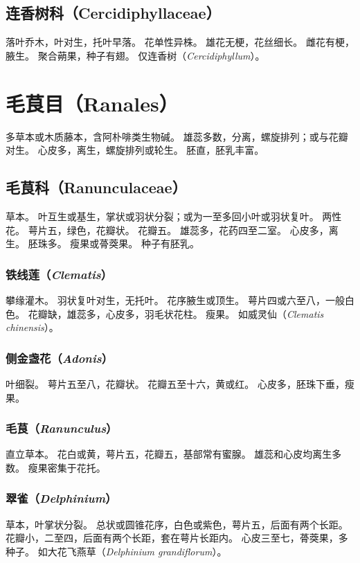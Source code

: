 \documentclass[11pt]{article}
\begin{document}
\begin{sloppypar}
\subsection{连香树科（Cercidiphyllaceae）}
落叶乔木，叶对生，托叶早落。
花单性异株。
雄花无梗，花丝细长。
雌花有梗，腋生。
聚合蒴果，种子有翅。
仅连香树（\textit{Cercidiphyllum}）。

\section{毛茛目（Ranales）}
多草本或木质藤本，含阿朴啡类生物碱。
雄蕊多数，分离，螺旋排列；或与花瓣对生。
心皮多，离生，螺旋排列或轮生。
胚直，胚乳丰富。

\subsection{毛茛科（Ranunculaceae）}
草本。
叶互生或基生，掌状或羽状分裂；或为一至多回小叶或羽状复叶。
两性花。
萼片五，绿色，花瓣状。
花瓣五。
雄蕊多，花药四至二室。
心皮多，离生。
胚珠多。
瘦果或蓇葖果。
种子有胚乳。

\subsubsection{铁线莲（\textit{Clematis}）}
攀缘灌木。
羽状复叶对生，无托叶。
花序腋生或顶生。
萼片四或六至八，一般白色。
花瓣缺，雄蕊多，心皮多，羽毛状花柱。
瘦果。
如威灵仙（\textit{Clematis chinensis}）。

\subsubsection{侧金盏花（\textit{Adonis}）}
叶细裂。
萼片五至八，花瓣状。
花瓣五至十六，黄或红。
心皮多，胚珠下垂，瘦果。

\subsubsection{毛茛（\textit{Ranunculus}）}
直立草本。
花白或黄，萼片五，花瓣五，基部常有蜜腺。
雄蕊和心皮均离生多数。
瘦果密集于花托。

\subsubsection{翠雀（\textit{Delphinium}）}
草本，叶掌状分裂。
总状或圆锥花序，白色或紫色，萼片五，后面有两个长距。
花瓣小，二至四，后面有两个长距，套在萼片长距内。
心皮三至七，蓇葖果，多种子。
如大花飞燕草（\textit{Delphinium grandiflorum}）。


\end{sloppypar}
\end{document}
